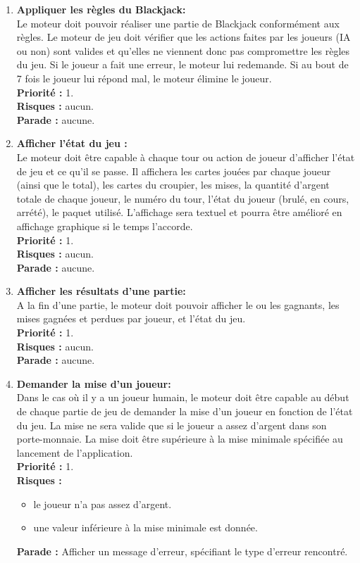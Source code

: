 \begin{enumerate}

    \item \textbf{Appliquer les règles du Blackjack:} \\
    Le moteur doit pouvoir réaliser une partie de Blackjack conformément aux règles.
    Le moteur de jeu doit vérifier que les actions faites par les joueurs (IA ou non) sont valides et qu'elles ne viennent donc pas compromettre les règles du jeu. Si le joueur a fait une erreur, le moteur lui redemande. Si au bout de 7 fois le joueur lui répond mal, le moteur élimine le joueur. \\
    \textbf{Priorité :} 1. \\
    \textbf{Risques :} aucun. \\
    \textbf{Parade :} aucune.

    \item \textbf{Afficher l'état du jeu :} \\
    Le moteur doit être capable à chaque tour ou action de joueur d'afficher l'état de jeu et ce qu'il se passe. Il affichera les cartes jouées par chaque joueur (ainsi que le total), les cartes du croupier, les mises, la quantité d'argent totale de chaque joueur, le numéro du tour, l'état du joueur (brulé, en cours, arrété), le paquet utilisé. L'affichage sera textuel et pourra être amélioré en affichage graphique si le temps l'accorde. \\
    \textbf{Priorité :} 1. \\
    \textbf{Risques :} aucun. \\
    \textbf{Parade :} aucune.

    \item \textbf{Afficher les résultats d'une partie:} \\
    A la fin d'une partie, le moteur doit pouvoir afficher le ou les gagnants, les mises gagnées et perdues par joueur, et l'état du jeu. \\
    \textbf{Priorité :} 1. \\
    \textbf{Risques :} aucun. \\
    \textbf{Parade :} aucune.

    \item \textbf{Demander la mise d'un joueur:}\\
    Dans le cas où il y a un joueur humain, le moteur doit être capable au début de chaque partie de jeu de demander la mise d'un joueur en fonction de l'état du jeu. La mise ne sera valide que si le joueur a assez d'argent dans son porte-monnaie. La mise doit être supérieure à la mise minimale spécifiée au lancement de l'application. \\
    \textbf{Priorité :} 1. \\
    \textbf{Risques :} 
    \begin{itemize}
        \item le joueur n'a pas assez d'argent.
        \item une valeur inférieure à la mise minimale est donnée.
    \end{itemize}
    \textbf{Parade :} Afficher un message d'erreur, spécifiant le type d'erreur rencontré.
    

\end{enumerate}
